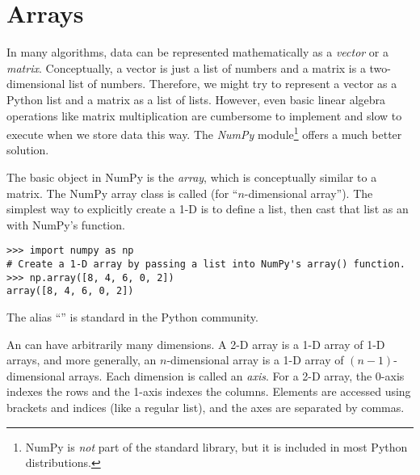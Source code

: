 \label{lab:NumPy}

\section*{Arrays} %

In many algorithms, data can be represented mathematically as a \emph{vector} or a \emph{matrix}.
Conceptually, a vector is just a list of numbers and a matrix is a two-dimensional list of numbers.
Therefore, we might try to represent a vector as a Python list and a matrix as a list of lists.
However, even basic linear algebra operations like matrix multiplication are cumbersome to implement and slow to execute when we store data this way.
The \emph{NumPy} module\footnote{NumPy is \emph{not} part of the standard library, but it is included in most Python distributions.} offers a much better solution.

The basic object in NumPy is the \emph{array}, which is conceptually similar to a matrix.
The NumPy array class is called  (for ``$n$-dimensional array'').
The simplest way to explicitly create a 1-D  is to define a list, then cast that list as an  with NumPy's  function.

\begin{lstlisting}
>>> import numpy as np
# Create a 1-D array by passing a list into NumPy's array() function.
>>> np.array([8, 4, 6, 0, 2])
array([8, 4, 6, 0, 2])
\end{lstlisting}
%
The alias ``'' is standard in the Python community. %

An  can have arbitrarily many dimensions.
A 2-D array is a 1-D array of 1-D arrays, and more generally, an $n$-dimensional array is a 1-D array of $(n-1)$-dimensional arrays.
Each dimension is called an \emph{axis}.
For a 2-D array, the 0-axis indexes the rows and the 1-axis indexes the columns.
Elements are accessed using brackets and indices (like a regular list), and the axes are separated by commas.

